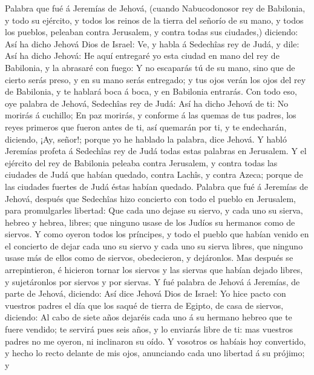  Palabra que fué á Jeremías de Jehová, (cuando
Nabucodonosor rey de Babilonia, y todo su ejército, y todos los reinos
de la tierra del señorío de su mano, y todos los pueblos, peleaban
contra Jerusalem, y contra todas sus ciudades,) diciendo: 
Así ha dicho Jehová Dios de Israel: Ve, y habla á Sedechîas rey de Judá,
y dile: Así ha dicho Jehová: He aquí entregaré yo esta ciudad en mano
del rey de Babilonia, y la abrasaré con fuego:  Y no
escaparás tú de su mano, sino que de cierto serás preso, y en su mano
serás entregado; y tus ojos verán los ojos del rey de Babilonia, y te
hablará boca á boca, y en Babilonia entrarás.  Con todo
eso, oye palabra de Jehová, Sedechîas rey de Judá: Así ha dicho Jehová
de ti: No morirás á cuchillo;  En paz morirás, y conforme
á las quemas de tus padres, los reyes primeros que fueron antes de ti,
así quemarán por ti, y te endecharán, diciendo, ¡Ay, señor!; porque yo
he hablado la palabra, dice Jehová.  Y habló Jeremías
profeta á Sedechîas rey de Judá todas estas palabras en Jerusalem.
 Y el ejército del rey de Babilonia peleaba contra
Jerusalem, y contra todas las ciudades de Judá que habían quedado,
contra Lachîs, y contra Azeca; porque de las ciudades fuertes de Judá
éstas habían quedado.  Palabra que fué á Jeremías de
Jehová, después que Sedechîas hizo concierto con todo el pueblo en
Jerusalem, para promulgarles libertad:  Que cada uno
dejase su siervo, y cada uno su sierva, hebreo y hebrea, libres; que
ninguno usase de los Judíos su hermanos como de siervos. 
Y como oyeron todos los príncipes, y todo el pueblo que habían venido en
el concierto de dejar cada uno su siervo y cada uno su sierva libres,
que ninguno usase más de ellos como de siervos, obedecieron, y
dejáronlos.  Mas después se arrepintieron, é hicieron
tornar los siervos y las siervas que habían dejado libres, y
sujetáronlos por siervos y por siervas.  Y fué palabra de
Jehová á Jeremías, de parte de Jehová, diciendo:  Así
dice Jehová Dios de Israel: Yo hice pacto con vuestros padres el día que
los saqué de tierra de Egipto, de casa de siervos, diciendo:
 Al cabo de siete años dejaréis cada uno á su hermano
hebreo que te fuere vendido; te servirá pues seis años, y lo enviarás
libre de ti: mas vuestros padres no me oyeron, ni inclinaron su oído.
 Y vosotros os habíais hoy convertido, y hecho lo recto
delante de mis ojos, anunciando cada uno libertad á su prójimo; y
